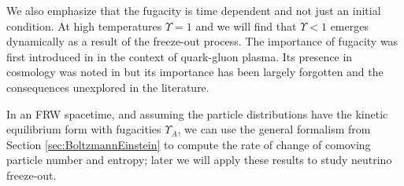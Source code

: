  We also emphasize that the fugacity is time dependent and not just an initial condition. At high temperatures $\Upsilon=1$ and we will find that $\Upsilon<1$ emerges dynamically as a result of the freeze-out process. The importance of fugacity was first introduced in \cite{Rafelski:1982pu} in the context of quark-gluon plasma. Its presence in cosmology was noted in \cite{Bernstein:1985th,Dolgov:1992wf} but its importance has been largely forgotten and the consequences unexplored in the literature. 

{\color{blue}
In an FRW spacetime, and assuming the particle distributions have the kinetic equilibrium form  with fugacities $\Upsilon_{A}$, we can use the general formalism from Section \ref{sec:BoltzmannEinstein} to compute the rate of change of comoving particle number and entropy; later we will apply these results to study neutrino freeze-out.

}
